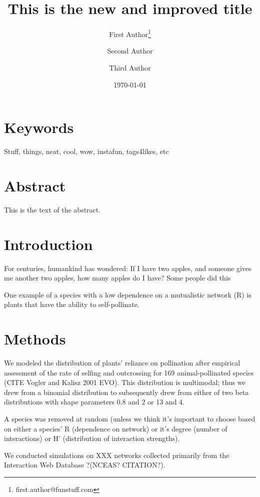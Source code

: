 \documentclass[11pt,letterpaper]{article} %
\date{\today}
\title{This is the new and improved title}
\author[1]{First Author\thanks{first.author@funstuff.com}}
\author[1,2]{Second Author}
\author[2]{Third Author}
\affil[1]{Department of Computer Science, \LaTeX\ University}
\affil[2]{Department of Mechanical Engineering, Superfabulous University}
\begin{document}
\maketitle
\linenumbers %
\def\linenumberfont{\normalfont\small\rmfamily} %


\section*{Keywords}
Stuff, things, neat, cool, wow, instafun, tags4likes, etc

\section*{Abstract}
This is the text of the abstract.

\section*{Introduction}
For centuries, humankind has wondered: If I have two apples, and someone gives me another two apples, how many apples do I have? Some people did this \citep{Darwin1859}

One example of a species with a low dependence on a mutualistic network (R) is plants that have the ability to self-pollinate. 


\section*{Methods}
We modeled the distribution of plants' reliance on pollination after empirical assessment of the rate of selfing and outcrossing for 169 animal-pollinated species (CITE Vogler and Kalisz 2001 EVO). This distribution is multimodal; thus we drew from a binomial distribution to subsequently drew from either of two beta distributions with shape parameters 0.8 and 2 or 13 and 4.

A species was removed at random (unless we think it's important to choose based on either a species' R (dependence on network) or it's degree (number of interactions) or H' (distribution of interaction strengths).

We conducted simulations on XXX networks collected primarily from the Interaction Web Database ?(NCEAS? CITATION?).
\end{document}
